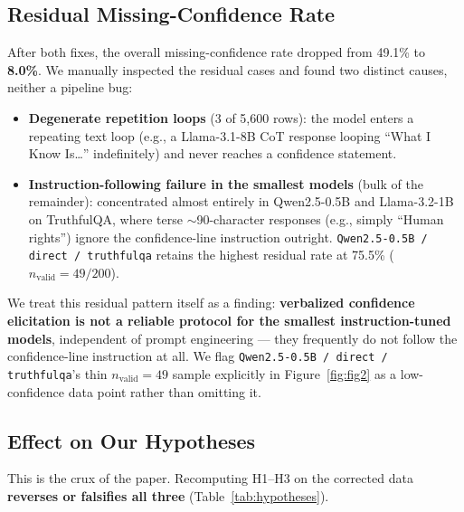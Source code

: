 \documentclass{article}
\begin{document}
\subsection{Residual Missing-Confidence Rate}

After both fixes, the overall missing-confidence rate dropped from 49.1\% to \textbf{8.0\%}. We manually inspected the residual cases and found two distinct causes, neither a pipeline bug:

\begin{itemize}
    \item \textbf{Degenerate repetition loops} (3 of 5,600 rows): the model enters a repeating text loop (e.g., a Llama-3.1-8B CoT response looping ``What I Know Is\ldots'' indefinitely) and never reaches a confidence statement.
    \item \textbf{Instruction-following failure in the smallest models} (bulk of the remainder): concentrated almost entirely in Qwen2.5-0.5B and Llama-3.2-1B on TruthfulQA, where terse $\sim$90-character responses (e.g., simply ``Human rights'') ignore the confidence-line instruction outright. \texttt{Qwen2.5-0.5B / direct / truthfulqa} retains the highest residual rate at 75.5\% ($n_{\text{valid}}=49/200$).
\end{itemize}

We treat this residual pattern itself as a finding: \textbf{verbalized confidence elicitation is not a reliable protocol for the smallest instruction-tuned models}, independent of prompt engineering --- they frequently do not follow the confidence-line instruction at all. We flag \texttt{Qwen2.5-0.5B / direct / truthfulqa}'s thin $n_{\text{valid}}=49$ sample explicitly in Figure~\ref{fig:fig2} as a low-confidence data point rather than omitting it.

\subsection{Effect on Our Hypotheses}
\label{sec:bug-effect}

This is the crux of the paper. Recomputing H1--H3 on the corrected data \textbf{reverses or falsifies all three} (Table~\ref{tab:hypotheses}).
\end{document}
